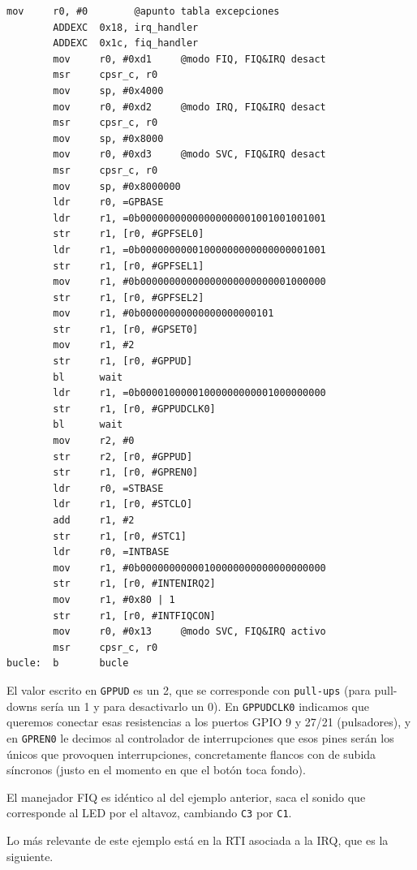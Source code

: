 \begin{lstlisting}[caption={Programa principal de inter5.c},label={lst:codigoPract5_5}]
        mov     r0, #0        @apunto tabla excepciones
        ADDEXC  0x18, irq_handler
        ADDEXC  0x1c, fiq_handler
        mov     r0, #0xd1     @modo FIQ, FIQ&IRQ desact
        msr     cpsr_c, r0
        mov     sp, #0x4000
        mov     r0, #0xd2     @modo IRQ, FIQ&IRQ desact
        msr     cpsr_c, r0
        mov     sp, #0x8000
        mov     r0, #0xd3     @modo SVC, FIQ&IRQ desact
        msr     cpsr_c, r0
        mov     sp, #0x8000000
        ldr     r0, =GPBASE
        ldr     r1, =0b00000000000000000001001001001001
        str     r1, [r0, #GPFSEL0]
        ldr     r1, =0b00000000001000000000000000001001
        str     r1, [r0, #GPFSEL1]
        mov     r1, #0b00000000000000000000000001000000
        str     r1, [r0, #GPFSEL2]
        mov     r1, #0b00000000000000000000101
        str     r1, [r0, #GPSET0]
        mov     r1, #2
        str     r1, [r0, #GPPUD]
        bl      wait
        ldr     r1, =0b00001000001000000000001000000000
        str     r1, [r0, #GPPUDCLK0]
        bl      wait
        mov     r2, #0
        str     r2, [r0, #GPPUD]
        str     r1, [r0, #GPREN0]
        ldr     r0, =STBASE
        ldr     r1, [r0, #STCLO]
        add     r1, #2
        str     r1, [r0, #STC1]
        ldr     r0, =INTBASE
        mov     r1, #0b00000000000100000000000000000000
        str     r1, [r0, #INTENIRQ2]
        mov     r1, #0x80 | 1
        str     r1, [r0, #INTFIQCON]
        mov     r0, #0x13     @modo SVC, FIQ&IRQ activo
        msr     cpsr_c, r0
bucle:  b       bucle
\end{lstlisting}

El valor escrito en {\tt GPPUD} es un 2, que se corresponde con {\tt pull-ups} (para pull-downs
sería un 1 y para desactivarlo un 0). En {\tt GPPUDCLK0} indicamos que queremos conectar esas
resistencias a los puertos GPIO 9 y 27/21 (pulsadores), y en {\tt GPREN0} le decimos al controlador
de interrupciones que esos pines serán los únicos que provoquen interrupciones, concretamente
flancos con de subida síncronos (justo en el momento en que el botón toca fondo).

El manejador FIQ es idéntico al del ejemplo anterior, saca el sonido que corresponde al LED
por el altavoz, cambiando {\tt C3} por {\tt C1}.

Lo más relevante de este ejemplo está en la RTI asociada a la IRQ, que es la siguiente.

